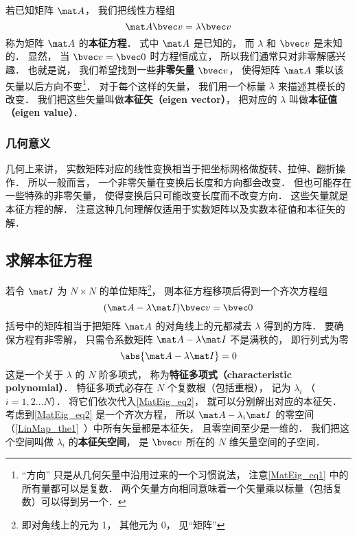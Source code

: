

若已知矩阵 $\mat A$， 我们把线性方程组
\begin{equation}\label{MatEig_eq1}
\mat A \bvec v = \lambda \bvec v
\end{equation}
称为矩阵 $\mat A$ 的\textbf{本征方程}． 式中 $\mat A$ 是已知的， 而 $\lambda$ 和 $\bvec v$ 是未知的． 显然， 当 $\bvec v = \bvec 0$ 时方程恒成立， 所以我们通常只对非零解感兴趣． 也就是说， 我们希望找到一些\textbf{非零矢量} $\bvec v$， 使得矩阵 $\mat A$ 乘以该矢量以后方向不变\footnote{“方向” 只是从几何矢量中沿用过来的一个习惯说法， 注意\autoref{MatEig_eq1} 中的所有量都可以是复数． 两个矢量方向相同意味着一个矢量乘以标量（包括复数）可以得到另一个．}． 对于每个这样的矢量， 我们用一个标量 $\lambda$ 来描述其模长的改变． 我们把这些矢量叫做\textbf{本征矢（eigen vector）}， 把对应的 $\lambda$ 叫做\textbf{本征值（eigen value）}．

\subsubsection{几何意义}
几何上来讲， 实数矩阵对应的线性变换相当于把坐标网格做旋转、拉伸、翻折操作．%
所以一般而言， 一个非零矢量在变换后长度和方向都会改变． 但也可能存在一些特殊的非零矢量， 使得变换后只可能改变长度而不改变方向． 这些矢量就是本征方程的解． 注意这种几何理解仅适用于实数矩阵以及实数本征值和本征矢的解．

\subsection{求解本征方程}

若令 $\mat I$ 为 $N\times N$ 的单位矩阵\footnote{即对角线上的元为 1， 其他元为 0， 见“矩阵”}， 则本征方程移项后得到一个齐次方程组
\begin{equation}\label{MatEig_eq2}
(\mat A - \lambda\mat I)\bvec v = \bvec 0
\end{equation}
括号中的矩阵相当于把矩阵 $\mat A$ 的对角线上的元都减去 $\lambda$ 得到的方阵． 要确保方程有非零解， 只需令系数矩阵 $\mat A - \lambda\mat I$ 不是满秩的， 即行列式为零
\begin{equation}\label{MatEig_eq4}
\abs{\mat A - \lambda\mat I} = 0
\end{equation}
这是一个关于 $\lambda$ 的 $N$ 阶多项式， 称为\textbf{特征多项式（characteristic polynomial）}． 特征多项式必存在 $N$ 个复数根（包括重根），%
记为 $\lambda_i$ （$i = 1, 2\dots N$）． 将它们依次代入\autoref{MatEig_eq2}， 就可以分别解出对应的本征矢． 考虑到\autoref{MatEig_eq2} 是一个齐次方程， 所以 $\mat A - \lambda_i\mat I$ 的零空间（\autoref{LinMap_the1}~）中所有矢量都是本征矢， 且零空间至少是一维的． 我们把这个空间叫做 $\lambda_i$ 的\textbf{本征矢空间}， 是 $\bvec v$ 所在的 $N$ 维矢量空间的子空间．

